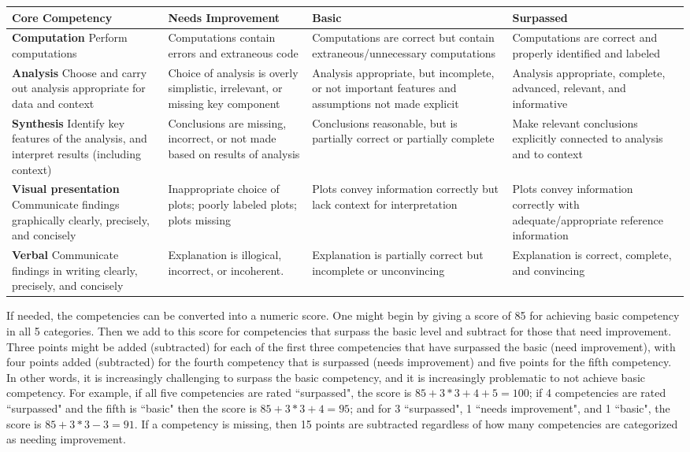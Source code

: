 \begin{tabular}{| p{4cm} | p{4cm} | p{4cm} | p{4cm} |}
\hline
 Core Competency &  Needs Improvement & Basic & Surpassed \\
 \hline
 \hline		
\textbf{Computation}
Perform computations &
Computations contain errors and extraneous code &
Computations are correct but contain extraneous/unnecessary computations	&
Computations are correct and properly identified and labeled \\
 \hline
\textbf{Analysis}
Choose and carry out analysis appropriate for data and context	 &
Choice of analysis is overly simplistic, irrelevant, or missing key component &
Analysis appropriate, but incomplete, or not important features and assumptions not made explicit &
 Analysis appropriate, complete, advanced, relevant, and informative \\
  \hline
\textbf{Synthesis}
Identify key features of the analysis, and interpret results (including context) &
 Conclusions are missing, incorrect, or not made based on results of analysis &
 Conclusions reasonable, but is partially correct or partially complete &
 Make relevant conclusions explicitly connected to analysis and to context \\
  \hline
\textbf{Visual presentation}
Communicate findings graphically clearly, precisely, and concisely  & 
 Inappropriate choice of plots; poorly labeled plots; plots missing &
 Plots convey information correctly but lack context for interpretation &
 Plots convey information correctly with adequate/appropriate reference information \\
  \hline
\textbf{Verbal}
Communicate findings in writing clearly, precisely, and concisely &
 Explanation is illogical, incorrect, or incoherent. &
 Explanation is partially correct but incomplete or unconvincing	&
 Explanation is correct, complete, and convincing \\
 \hline
 \end{tabular}

If needed, the competencies can be converted into a numeric score. 
One might begin by giving a score of 85 for achieving basic competency in all 5 categories.
Then we add to this score for competencies that surpass the basic level and subtract for 
those that need improvement.
Three points might be added (subtracted) for each of the first three competencies that 
have surpassed the basic (need improvement), with
four points added (subtracted) for the fourth competency that is surpassed (needs improvement) 
and five points for the fifth competency. 
In other words, it is increasingly challenging to surpass the basic competency, 
and it is increasingly problematic to not achieve basic competency.
For example, if all five competencies
are rated ``surpassed", the score is $85 + 3*3 +4 + 5 = 100$; 
if 4 competencies are rated ``surpassed" and the fifth is ``basic" then the score is $85 + 3*3 +4 = 95$;  and for 3  ``surpassed", 1 
``needs improvement", and 1 ``basic", the score is $85 + 3*3 - 3 = 91$.
If a competency is missing, then 15 points are subtracted regardless of how many 
competencies are categorized as needing improvement.
